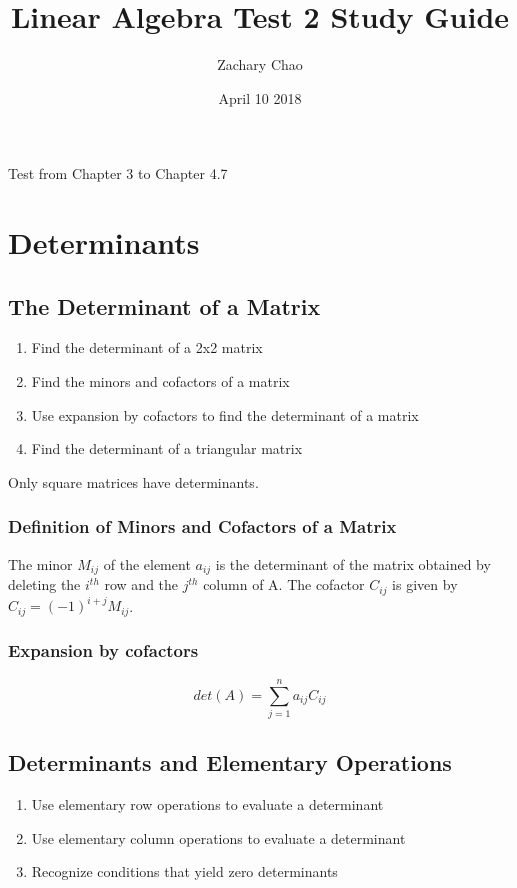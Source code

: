 \documentclass[12pt, letterpaper, twoside]{article}
\title{Linear Algebra Test 2 Study Guide}
\author{Zachary Chao}
\date{April 10 2018}
\begin{document}
\maketitle
Test from Chapter 3 to Chapter 4.7

\setcounter{section}{2}
\section{Determinants}
\subsection{The Determinant of a Matrix}
\begin{enumerate}
\item Find the determinant of a 2x2 matrix
\item Find the minors and cofactors of a matrix
\item Use expansion by cofactors to find the determinant of a matrix
\item Find the determinant of a triangular matrix
\end{enumerate}

Only square matrices have determinants.\\

\subsubsection*{Definition of Minors and Cofactors of a Matrix}
The minor $M_{ij}$ of the element $a_{ij}$ is the determinant of the matrix obtained by deleting the $i^{th}$ row and the $j^{th}$ column of A. The cofactor $C_{ij}$ is given by $C_{ij} = (-1)^{i+j}M_{ij}$.\\

\subsubsection*{Expansion by cofactors}
$$det(A) = \sum_{j=1}^n a_{ij} C_{ij}$$

\subsection{Determinants and Elementary Operations}
\begin{enumerate}
\item Use elementary row operations to evaluate a determinant
\item Use elementary column operations to evaluate a determinant
\item Recognize conditions that yield zero determinants
\end{enumerate}
\end{document}
